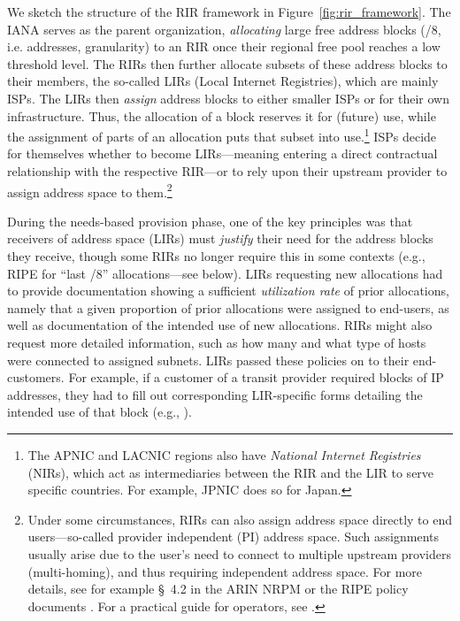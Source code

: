 \documentclass[letter]{sigcomm-alternate}
\begin{document}
We sketch the structure of the RIR framework in
Figure~\ref{fig:rir_framework}.  The IANA serves as the parent organization,
\textit{allocating} large free address blocks (/8, i.e.  addresses,
granularity) to an RIR once their regional free pool reaches a low
threshold level.  The RIRs then further allocate subsets of these address
blocks to their members, the so-called LIRs (Local Internet Registries),
which are mainly ISPs. 
The LIRs then \textit{assign} address blocks to either smaller ISPs or 
for their own infrastructure. Thus, the allocation of a block  reserves it for 
(future) use, while the assignment of parts of an allocation puts that subset 
into use.\footnote{
	The APNIC and LACNIC regions also have \emph{National Internet  Registries} 
	(NIRs), which act as intermediaries between the RIR and the  LIR to serve 
	specific countries. For example, JPNIC does so for Japan.}
ISPs decide for themselves whether to become LIRs---meaning entering a direct
contractual relationship with the respective RIR---or to rely upon their
upstream provider to assign address space to them.\footnote{
	Under some circumstances, RIRs can also assign address space directly to 
	end users---so-called provider independent (PI) address space. Such
	assignments usually arise due to the user's
	need to connect to multiple upstream providers 
	(multi-homing), and thus requiring independent address space. For more 
	details, see for example \S~4.2 in the ARIN NRPM \cite{arin_manual} or the 
	RIPE policy documents \cite{ripe_policy}.  
	For a practical guide for operators, see \cite{van2002bgp}.
}

During the needs-based provision phase, one of the key principles was
that receivers of address space (LIRs) must \emph{justify} their need for
the address blocks they receive, though some RIRs no longer require this in
some contexts (e.g., RIPE for ``last /8'' allocations---see below).
LIRs requesting new allocations had to provide documentation showing a
sufficient \emph{utilization rate} of prior allocations, namely that a given
proportion of prior allocations were assigned to end-users, as well as
documentation of the intended use of new allocations. RIRs might also
request more detailed information, such as how many and what type of hosts
were connected to assigned subnets. LIRs passed these policies on to their
end-customers.  For example, if a customer of a transit provider required
blocks of IP addresses, they had to fill out corresponding LIR-specific forms
detailing the intended use of that block (e.g., \cite{ntt_policy}).
\end{document}
